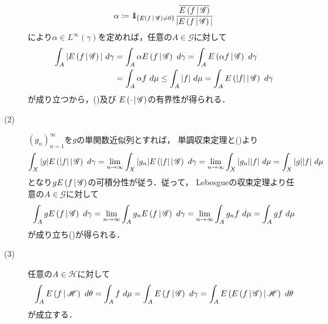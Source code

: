 \begin{prf}
\begin{description}
\begin{align}
					\alpha \coloneqq \mbox{1}\hspace{-0.25em}\mbox{l}_{\left\{E\left( f \, \middle|\, \mathscr{G} \right) \neq 0\right\}} 
						\frac{\overline{E\left( f \, \middle|\, \mathscr{G} \right)}}{|E\left( f \, \middle|\, \mathscr{G} \right)|}
				\end{align}
				により$\alpha \in L^\infty(\gamma)$を定めれば，任意の$A \in \mathscr{G}$に対して
				\begin{align}
					\int_A |E\left( f \, \middle|\, \mathscr{G} \right)|\ d\gamma
					&= \int_A \alpha E\left( f \, \middle|\, \mathscr{G} \right)\ d\gamma
					= \int_A E\left( \alpha f \, \middle|\, \mathscr{G} \right)\ d\gamma \\
					&= \int_A \alpha f\ d\mu
					\leq \int_A |f|\ d\mu
					= \int_A E\left( |f| \, \middle|\, \mathscr{G} \right)\ d\gamma
				\end{align}
				が成り立つから，()及び
				$E\left( \cdot \, \middle|\, \mathscr{G} \right)$の有界性が得られる．
				
			\item[(2)]
				$(g_n)_{n=1}^\infty$を$g$の単関数近似列とすれば，
				単調収束定理と()より
				\begin{align}
					\int_X |g|E\left( |f| \, \middle|\, \mathscr{G} \right)\ d\gamma
					= \lim_{n \to \infty} \int_X |g_n|E\left( |f| \, \middle|\, \mathscr{G} \right)\ d\gamma
					= \lim_{n \to \infty} \int_X |g_n||f|\ d\mu
					= \int_X |g||f|\ d\mu
				\end{align}
				となり$gE\left( f \, \middle|\, \mathscr{G} \right)$の可積分性が従う．従って，
				Lebesgueの収束定理より任意の$A \in \mathscr{G}$に対して
				\begin{align}
					\int_A gE\left( f \, \middle|\, \mathscr{G} \right)\ d\gamma
					= \lim_{n \to \infty} \int_A g_nE\left( f \, \middle|\, \mathscr{G} \right)\ d\gamma
					= \lim_{n \to \infty} \int_A g_n f\ d\mu
					= \int_A gf\ d\mu
				\end{align}
				が成り立ち()が得られる．
				
			\item[(3)]
				任意の$A \in \mathscr{H}$に対して
				\begin{align}
					\int_A \cexp{f}{\mathscr{H}}\ d\theta
					= \int_A f\ d\mu
					= \int_A \cexp{f}{\mathscr{G}}\ d\gamma
					= \int_A \cexp{\cexp{f}{\mathscr{G}}}{\mathscr{H}}\ d\theta
				\end{align}
				が成立する．
				

\end{description}
\end{prf}
